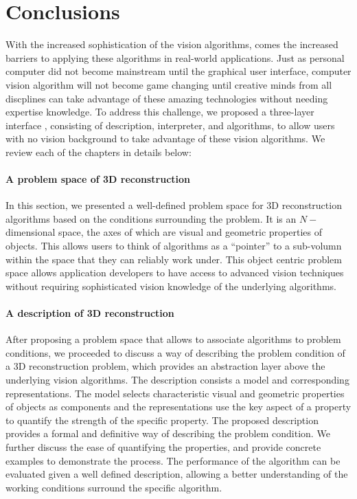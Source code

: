 
\chapter{Conclusions}
\label{ch:conclusion}
With the increased sophistication of the vision algorithms, comes the increased barriers to applying these algorithms in real-world applications. Just as personal computer did not become mainstream until the graphical user interface, computer vision algorithm will not become game changing until creative minds from all discplines can take advantage of these amazing technologies without needing expertise knowledge. To address this challenge, we proposed a three-layer interface , consisting of description, interpreter, and algorithms, to allow users with no vision background to take advantage of these vision algorithms. We review each of the chapters in details below:

\subsubsection{A problem space of 3D reconstruction}
In this section, we presented a well-defined problem space for 3D reconstruction algorithms based on the conditions surrounding the problem. It is an $N-$dimensional space, the axes of which are visual and geometric properties of objects. This allows users to think of algorithms as a ``pointer'' to a sub-volumn within the space that they can reliably work under. This object centric problem space allows application developers to have access to advanced vision techniques without requiring sophisticated vision knowledge of the underlying algorithms.

\subsubsection{A description of 3D reconstruction}
After proposing a problem space that allows to associate algorithms to problem conditions, we proceeded to discuss a way of describing the problem condition of a 3D reconstruction problem, which provides an abstraction layer above the underlying vision algorithms. The description consists a model and corresponding representations. The model selects characteristic visual and geometric properties of objects as components and the representations use the key aspect of a property to quantify the strength of the specific property. The proposed description provides a formal and definitive way of describing the problem condition. We further discuss the ease of quantifying the properties, and provide concrete examples to demonstrate the process. The performance of the algorithm can be evaluated given a well defined description, allowing a better understanding of the working conditions surround the specific algorithm.

